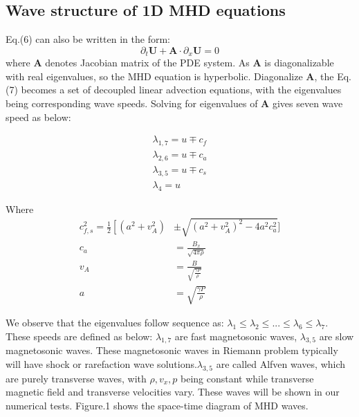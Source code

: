 \documentclass[11pt, oneside]{article}   	%
\begin{document}
\subsection{Wave structure of 1D MHD equations}
Eq.(6) can also be written in the form:
\begin{equation}
    \partial _ { t } \mathbf { U } + \mathbf { A } \cdot \partial _ { x } \mathbf { U } = 0
\end{equation}
where $\mathbf{A}$ denotes Jacobian matrix of the PDE system. As $\mathbf{A}$ is diagonalizable with real eigenvalues, so the MHD equation is hyperbolic. Diagonalize $\mathbf{A}$, the Eq.(7) becomes a set of decoupled linear advection equations, with the eigenvalues being corresponding wave speeds. Solving for eigenvalues of $\mathbf{A}$ gives seven wave speed as below:

\begin{equation}
\begin{array} { l } { \lambda _ { 1,7 } = u \mp c _ { f } } \\ { \lambda _ { 2,6 } = u \mp c _ { a } } \\ { \lambda _ { 3,5 } = u \mp c _ { s } } \\ { \lambda _ { 4 } = u } \end{array}
\end{equation}

Where 
\begin{equation}
\begin{aligned} c _ { f , s } ^ { 2 } = \frac { 1 } { 2 } \left[ \left( a ^ { 2 } + v _ { A } ^ { 2 } \right) \right. & \pm \sqrt { \left( a ^ { 2 } + v _ { A } ^ { 2 } \right) ^ { 2 } - 4 a ^ { 2 } c _ { a } ^ { 2 } } ] \\ c _ { a } & = \frac { B _ { x } } { \sqrt { 4 \pi \rho } } \\ v _ { A } & = \frac { B } { \sqrt { \frac { \gamma P } { \rho } } } \\ a & = \sqrt { \frac { \gamma P } { \rho } } \end{aligned}
\end{equation}

We observe that the eigenvalues follow sequence as:
$\lambda_1 \leq \lambda_2 \leq ... \leq \lambda_6 \leq \lambda_7$.
These speeds are defined as below: $\lambda_{1,7}$ are fast magnetosonic waves, $\lambda_{3,5}$ are slow magnetosonic waves. These magnetosonic waves in Riemann problem typically will have shock or rarefaction wave solutions.$\lambda_{3,5}$ are called  Alfven  waves, which are purely transverse waves, with $\rho,v_x,p$ being constant while transverse magnetic field and transverse velocities vary. These waves will be shown in our numerical tests. Figure.1 shows the space-time diagram of MHD waves.
\end{document}
